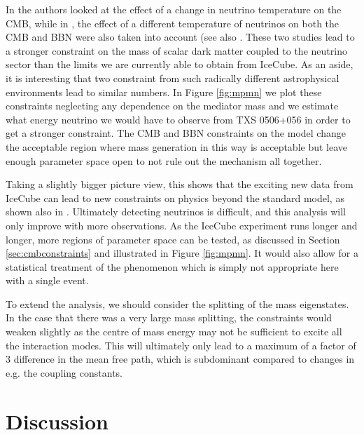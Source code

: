 In \cite{Boehm} the authors looked at the effect of a change in neutrino temperature on the CMB, while in \cite{Nollett2015}, the effect of a different temperature of neutrinos on both the CMB and BBN were also taken into account (see also \cite{Escudero2019}. These two studies lead to a stronger constraint on the mass of scalar dark matter coupled to the neutrino sector than the limits we are currently able to obtain from IceCube.  As an aside, it is interesting that two constraint from such radically different astrophysical environments lead to similar numbers. In Figure \ref{fig:mpmn} we plot these constraints neglecting any dependence on the mediator mass and we estimate what energy neutrino we would have to observe from TXS 0506+056 in order to get a stronger constraint. The CMB and BBN constraints on the model change the acceptable region where mass generation in this way is acceptable but leave enough parameter space open to not rule out the mechanism all together.


Taking a slightly bigger picture view, this shows that the exciting new data from IceCube can lead to new constraints on physics beyond the standard model, as shown also in \cite{Kelly}. Ultimately detecting neutrinos is difficult, and this analysis will only improve with more observations. As the IceCube experiment runs longer and longer, more regions of parameter space can be tested, as discussed in Section \ref{sec:cmbconstraints} and illustrated in Figure \ref{fig:mpmn}. It would also allow for a statistical treatment of the phenomenon which is simply not appropriate here with a single event.

To extend the analysis, we should consider the splitting of the mass eigenstates. In the case that there was a very large mass splitting, the constraints would weaken slightly as the centre of mass energy may not be sufficient to excite all the interaction modes. This will ultimately only lead to a maximum of a factor of $3$ difference in the mean free path, which is subdominant compared to changes in e.g. the coupling constants.

\vspace{-0.2cm}

\section{Discussion}\label{sec:conclusion}

